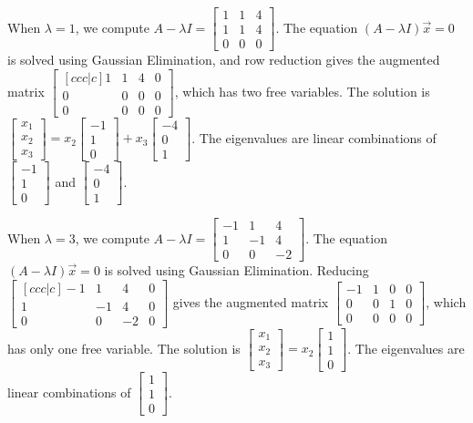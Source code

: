\documentclass[10pt]{article}
\begin{document}
When $\lambda=1$, we compute $A-\lambda I =\begin{bmatrix}1&1&4\\ 1&1&4\\ 0&0&0\end{bmatrix} $. The equation  $(A-\lambda I )\vec x=0$ is solved using Gaussian Elimination, and row reduction gives the augmented matrix $\begin{bmatrix}[ccc|c]1&1&4&0\\ 0&0&0&0\\ 0&0&0&0\end{bmatrix}$, which has two free variables. The solution is $\begin{bmatrix} x_1\\x_2\\ x_3\end{bmatrix} = x_2\begin{bmatrix} -1\\1\\0\end{bmatrix}+x_3\begin{bmatrix} -4\\0\\1\end{bmatrix} $. The eigenvalues are linear combinations of $\begin{bmatrix} -1\\1\\0\end{bmatrix}$ and $\begin{bmatrix} -4\\0\\1\end{bmatrix}$. 

When $\lambda=3$, we compute $A-\lambda I =\begin{bmatrix}-1&1&4\\ 1&-1&4\\ 0&0&-2\end{bmatrix} $. The equation  $(A-\lambda I )\vec x=0$ is solved using Gaussian Elimination. Reducing $\begin{bmatrix}[ccc|c]-1&1&4&0\\ 1&-1&4&0\\ 0&0&-2&0\end{bmatrix}$ gives the augmented matrix $\begin{bmatrix}-1&1&0&0\\ 0&0&1&0\\ 0&0&0&0\end{bmatrix} $, which has only one free variable. The solution is $\begin{bmatrix} x_1\\x_2\\ x_3\end{bmatrix} = x_2\begin{bmatrix} 1\\1\\0\end{bmatrix}$. The eigenvalues are linear combinations of $\begin{bmatrix} 1\\1\\0\end{bmatrix}$.
\end{document}
